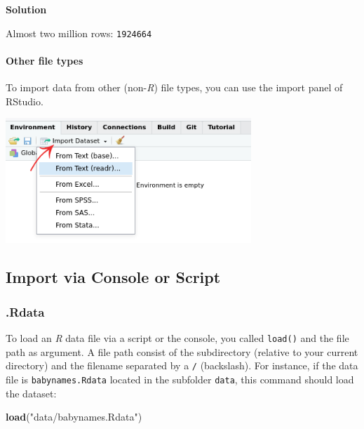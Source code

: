 \documentclass[
]{scrartcl}
\newenvironment{Shaded}{\begin{snugshade}}{\end{snugshade}}
\newcommand{\KeywordTok}[1]{\textcolor[rgb]{0.13,0.29,0.53}{\textbf{#1}}}
\newcommand{\NormalTok}[1]{#1}
\newcommand{\StringTok}[1]{\textcolor[rgb]{0.31,0.60,0.02}{#1}}
\newenvironment{webexsolution}[1]
    {\par\tiny\textbf{#1}}
    {\par}
\newcommand{\webexhide}[1]{\begin{webexsolution}{#1}}
\newcommand{\webexunhide}{\end{webexsolution}}
\begin{document}
\webexhide{Solution}

Almost two million rows: \texttt{1924664}
\webexunhide

\hypertarget{other-file-types}{%
\paragraph*{Other file types}\label{other-file-types}}

To import data from other (non-\emph{R}) file types, you can use the import panel of RStudio.

\includegraphics[width=350px]{images/data_import}

\hypertarget{import-via-console-or-script}{%
\subsection{Import via Console or Script}\label{import-via-console-or-script}}

\hypertarget{rdata}{%
\subsubsection*{.Rdata}\label{rdata}}

To load an \emph{R} data file via a script or the console, you called \texttt{load()} and the file path as argument. A file path consist of the subdirectory (relative to your current directory) and the filename separated by a \texttt{/} (backslash). For instance, if the data file is \texttt{babynames.Rdata} located in the subfolder \texttt{data}, this command should load the dataset:

\begin{Shaded}
\begin{Highlighting}[]
\KeywordTok{load}\NormalTok{(}\StringTok{"data/babynames.Rdata"}\NormalTok{)}
\end{Highlighting}
\end{Shaded}
\end{document}
